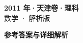 \documentclass[zihao=-4, a4paper]{ctexart}
\begin{document}
\begin{center}
  {\Large\bfseries 2011 年·天津卷·理科}\\[4pt]
  {\large 数学 · 解析版}
\end{center}
\medskip
{}

\clearpage
{}
\begin{center}{\Large\bfseries 参考答案与详细解析}\end{center}
\medskip

\end{document}
